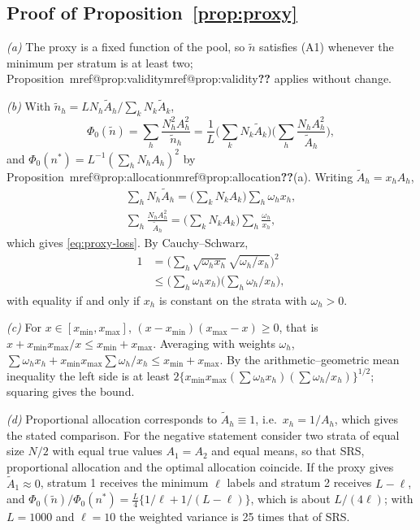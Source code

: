 \documentclass[pdflatex,sn-mathphys-num,iicol]{sn-jnl}
\makeatletter
\theoremstyle{thmstyleone}
\theoremstyle{thmstyletwo}
\theoremstyle{thmstylethree}
\newcommand{\Mref}[1]{\ifcsname mref@#1\endcsname\csname mref@#1\endcsname\else\textbf{??}\fi}
\makeatother
\begin{document}
\subsection{Proof of Proposition~\ref{prop:proxy}}

\emph{(a)} The proxy is a fixed function of the pool, so $\tilde n$ satisfies (A1) whenever the
minimum per stratum is at least two; Proposition~\Mref{prop:validity} applies without change.

\emph{(b)} With $\tilde n_h=LN_h\tilde A_h/\sum_kN_k\tilde A_k$,
\[
\Phi_0(\tilde n)=\sum_h\frac{N_h^2A_h^2}{\tilde n_h}=\frac1L\Big(\sum_kN_k\tilde A_k\Big)\Big(\sum_h\frac{N_hA_h^2}{\tilde A_h}\Big),
\]
and $\Phi_0(n^\ast)=L^{-1}(\sum_hN_hA_h)^2$ by Proposition~\Mref{prop:allocation}(a). Writing
$\tilde A_h=x_hA_h$,
\begin{gather*}
\sum_hN_h\tilde A_h=\Big(\sum_kN_kA_k\Big)\sum_h\omega_hx_h,\\
\sum_h\frac{N_hA_h^2}{\tilde A_h}=\Big(\sum_kN_kA_k\Big)\sum_h\frac{\omega_h}{x_h},
\end{gather*}
which gives \eqref{eq:proxy-loss}. By Cauchy--Schwarz,
\begin{align*}
1&=\Big(\sum_h\sqrt{\omega_hx_h}\sqrt{\omega_h/x_h}\Big)^2\\
&\le\Big(\sum_h\omega_hx_h\Big)\Big(\sum_h\omega_h/x_h\Big),
\end{align*}
with equality if and only if $x_h$ is constant on the strata with $\omega_h>0$.

\emph{(c)} For $x\in[x_{\min},x_{\max}]$, $(x-x_{\min})(x_{\max}-x)\ge0$, that is
$x+x_{\min}x_{\max}/x\le x_{\min}+x_{\max}$. Averaging with weights $\omega_h$,
$\sum\omega_hx_h+x_{\min}x_{\max}\sum\omega_h/x_h\le x_{\min}+x_{\max}$. By the arithmetic--geometric
mean inequality the left side is at least
$2\{x_{\min}x_{\max}(\sum\omega_hx_h)(\sum\omega_h/x_h)\}^{1/2}$; squaring gives the bound.

\emph{(d)} Proportional allocation corresponds to $\tilde A_h\equiv1$, i.e.\ $x_h=1/A_h$, which gives
the stated comparison. For the negative statement consider two strata of equal size $N/2$ with
equal true values $A_1=A_2$ and equal means, so that SRS, proportional allocation and the optimal
allocation coincide. If the proxy gives $\tilde A_1\approx0$, stratum 1 receives the minimum $\ell$
labels and stratum 2 receives $L-\ell$, and
$\Phi_0(\tilde n)/\Phi_0(n^\ast)=\frac{L}{4}\{1/\ell+1/(L-\ell)\}$, which is about $L/(4\ell)$; with
$L=1000$ and $\ell=10$ the weighted variance is 25 times that of SRS.
\end{document}
